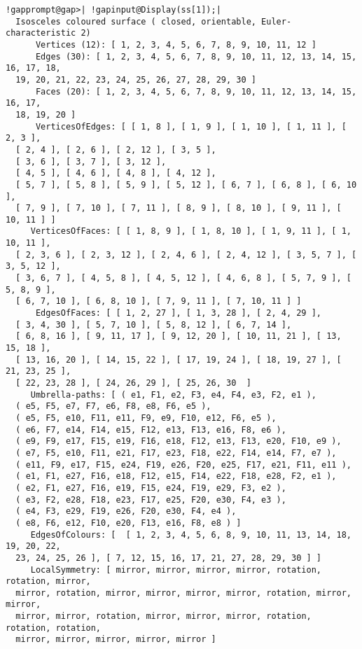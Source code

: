 \documentclass[a4paper,11pt]{report}
\begin{document}
{{ 
\begin{Verbatim}[commandchars=!@|,fontsize=\small,frame=single,label=Example]
  !gapprompt@gap>| !gapinput@Display(ss[1]);|
  Isosceles coloured surface ( closed, orientable, Euler-characteristic 2)
      Vertices (12): [ 1, 2, 3, 4, 5, 6, 7, 8, 9, 10, 11, 12 ]
      Edges (30): [ 1, 2, 3, 4, 5, 6, 7, 8, 9, 10, 11, 12, 13, 14, 15, 16, 17, 18,  
  19, 20, 21, 22, 23, 24, 25, 26, 27, 28, 29, 30 ]
      Faces (20): [ 1, 2, 3, 4, 5, 6, 7, 8, 9, 10, 11, 12, 13, 14, 15, 16, 17, 
  18, 19, 20 ]
      VerticesOfEdges: [ [ 1, 8 ], [ 1, 9 ], [ 1, 10 ], [ 1, 11 ], [ 2, 3 ], 
  [ 2, 4 ], [ 2, 6 ], [ 2, 12 ], [ 3, 5 ], 
  [ 3, 6 ], [ 3, 7 ], [ 3, 12 ],
  [ 4, 5 ], [ 4, 6 ], [ 4, 8 ], [ 4, 12 ], 
  [ 5, 7 ], [ 5, 8 ], [ 5, 9 ], [ 5, 12 ], [ 6, 7 ], [ 6, 8 ], [ 6, 10 ], 
  [ 7, 9 ], [ 7, 10 ], [ 7, 11 ], [ 8, 9 ], [ 8, 10 ], [ 9, 11 ], [ 10, 11 ] ]
     VerticesOfFaces: [ [ 1, 8, 9 ], [ 1, 8, 10 ], [ 1, 9, 11 ], [ 1, 10, 11 ], 
  [ 2, 3, 6 ], [ 2, 3, 12 ], [ 2, 4, 6 ], [ 2, 4, 12 ], [ 3, 5, 7 ], [ 3, 5, 12 ], 
  [ 3, 6, 7 ], [ 4, 5, 8 ], [ 4, 5, 12 ], [ 4, 6, 8 ], [ 5, 7, 9 ], [ 5, 8, 9 ], 
  [ 6, 7, 10 ], [ 6, 8, 10 ], [ 7, 9, 11 ], [ 7, 10, 11 ] ]
      EdgesOfFaces: [ [ 1, 2, 27 ], [ 1, 3, 28 ], [ 2, 4, 29 ],
  [ 3, 4, 30 ], [ 5, 7, 10 ], [ 5, 8, 12 ], [ 6, 7, 14 ], 
  [ 6, 8, 16 ], [ 9, 11, 17 ], [ 9, 12, 20 ], [ 10, 11, 21 ], [ 13, 15, 18 ],
  [ 13, 16, 20 ], [ 14, 15, 22 ], [ 17, 19, 24 ], [ 18, 19, 27 ], [ 21, 23, 25 ], 
  [ 22, 23, 28 ], [ 24, 26, 29 ], [ 25, 26, 30  ]
     Umbrella-paths: [ ( e1, F1, e2, F3, e4, F4, e3, F2, e1 ),
  ( e5, F5, e7, F7, e6, F8, e8, F6, e5 ),
  ( e5, F5, e10, F11, e11, F9, e9, F10, e12, F6, e5 ),
  ( e6, F7, e14, F14, e15, F12, e13, F13, e16, F8, e6 ),
  ( e9, F9, e17, F15, e19, F16, e18, F12, e13, F13, e20, F10, e9 ),
  ( e7, F5, e10, F11, e21, F17, e23, F18, e22, F14, e14, F7, e7 ),
  ( e11, F9, e17, F15, e24, F19, e26, F20, e25, F17, e21, F11, e11 ),
  ( e1, F1, e27, F16, e18, F12, e15, F14, e22, F18, e28, F2, e1 ),
  ( e2, F1, e27, F16, e19, F15, e24, F19, e29, F3, e2 ),
  ( e3, F2, e28, F18, e23, F17, e25, F20, e30, F4, e3 ),
  ( e4, F3, e29, F19, e26, F20, e30, F4, e4 ),
  ( e8, F6, e12, F10, e20, F13, e16, F8, e8 ) ]
     EdgesOfColours: [  [ 1, 2, 3, 4, 5, 6, 8, 9, 10, 11, 13, 14, 18, 19, 20, 22,  
  23, 24, 25, 26 ], [ 7, 12, 15, 16, 17, 21, 27, 28, 29, 30 ] ]
     LocalSymmetry: [ mirror, mirror, mirror, mirror, rotation, rotation, mirror, 
  mirror, rotation, mirror, mirror, mirror, mirror, rotation, mirror, mirror,  
  mirror, mirror, rotation, mirror, mirror, mirror, rotation, rotation, rotation,  
  mirror, mirror, mirror, mirror, mirror ]
\end{Verbatim}
 

}}
\end{document}
